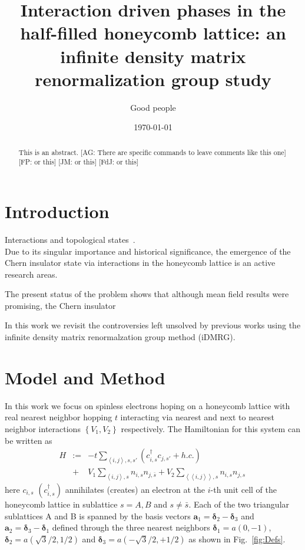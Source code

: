 \documentclass[aps,prx,10pt,twocolumn,floatfix,superscriptaddress,showpacs,numerical,footinbib]{revtex4-1}
\newcommand{\noteAG}[1]{{\color{blue} [AG: #1]}}
\newcommand{\noteFP}[1]{{\color{magenta} [FP: #1]}}
\newcommand{\noteJM}[1]{{\color{red} [JM: #1]}}
\newcommand{\noteFdJ}[1]{{\color{cyan} [FdJ: #1]}}
\newcommand{\bs}[1]{{\boldsymbol{#1}}}
\begin{document}
%
\title{Interaction driven phases in the half-filled honeycomb lattice: an infinite density matrix renormalization group study}
%
\author{Good people}
%
\date{\today}
%
\begin{abstract}
%
This is an abstract.
%
\noteAG{There are specific commands to leave comments like this one}\noteFP{or this}\noteJM{or this}\noteFdJ{or this}
%
\end{abstract}
%
\maketitle
%

\section{Introduction}
%
Interactions and topological states~\cite{H88}.\\
%

%
Due to its singular importance and historical significance, 
the emergence of the Chern insulator state via interactions in the honeycomb lattice is an active
research areas.
%


%
The present status of the problem shows that although mean field results were promising, the Chern insulator

In this work we revisit the controversies left unsolved by previous works using the infinite density matrix renormalzation group method (iDMRG). \\


\section{Model and Method}
%
In this work we focus on spinless electrons hoping on a honeycomb lattice with real nearest neighbor hopping $t$ interacting via nearest and next to nearest neighbor interactions 
$\left\lbrace V_{1},V_{2}\right\rbrace$ respectively. 
%
The Hamiltonian for this system can be written as
\begin{eqnarray}
\nonumber
%
H&:=&-t\sum_{\left\langle i,j\right\rangle ,s,s'}(c^{\dagger}_{i,s}c_{j,s'}+h.c.)\\
%
\;&+&
V_{1}\sum_{\left\langle i,j\right\rangle ,s }n_{i,s}n_{j,\bar{s}}+
%
V_{2}\sum_{\left\langle \left\langle i,j\right\rangle \right\rangle ,s }n_{i,s}n_{j,s}\,
%
\label{eq:H}
%
\end{eqnarray}
%
here $c_{i,s}$ $(c^{\dagger}_{i,s})$  annihilates (creates) an electron at the $i$-th unit cell of the honeycomb lattice
in sublattice $s=A,B$ and $s\neq\bar{s}$. 
%
Each of the two triangular sublattices A and B is spanned by the basis vectors
$\bs{a}_{1}=\bs{\delta}_{2}-\bs{\delta}_{3}$ and 
$\bs{a}_{2}=\bs{\delta}_{3}-\bs{\delta}_{1}$ defined through the three nearest neighbors $\bs{\delta}_{1}=a(0,-1)$,  
$\bs{\delta}_{2}=a(\sqrt{3}/2,1/2)$ and $\bs{\delta}_{3}=a(-\sqrt{3}/2,+1/2)$ as shown in Fig.~\ref{fig:Defs}.\\
%
\end{document}
